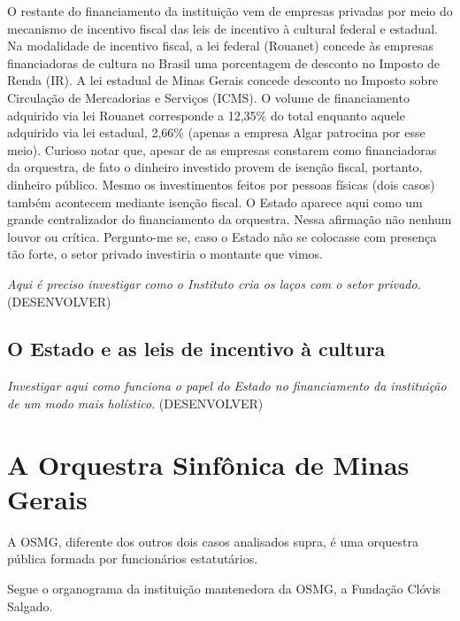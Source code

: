 \documentclass[a4paper, 12pt, openright, oneside, german, french, english, brazil]{abntex2}
\begin{document}
	O restante do financiamento da instituição vem de empresas privadas por meio do mecanismo de incentivo fiscal das leis de incentivo à cultural federal e estadual. Na modalidade de incentivo fiscal, a lei federal (Rouanet) concede às empresas financiadoras de cultura no Brasil uma porcentagem de desconto no Imposto de Renda (IR). A lei estadual de Minas Gerais concede desconto no Imposto sobre Circulação de Mercadorias e Serviços (ICMS). O volume de financiamento adquirido via lei Rouanet corresponde a 12,35\% do total enquanto aquele adquirido via lei estadual, 2,66\% (apenas a empresa Algar patrocina por esse meio). Curioso notar que, apesar de as empresas constarem como financiadoras da orquestra, de fato o dinheiro investido provem de isenção fiscal, portanto, dinheiro público. Mesmo os investimentos feitos por pessoas físicas (dois casos) também acontecem mediante isenção fiscal. O Estado aparece aqui como um grande centralizador do financiamento da orquestra. Nessa afirmação não nenhum louvor ou crítica. Pergunto-me se, caso o Estado não se colocasse com presença tão forte, o setor privado investiria o montante que vimos.
	
	\textit{Aqui é preciso investigar como o Instituto cria os laços com o setor privado.} (DESENVOLVER) 
	
	\subsection{O Estado e as leis de incentivo à cultura}
	
	\textit{Investigar aqui como funciona o papel do Estado no financiamento da instituição de um modo mais holístico}. (DESENVOLVER)
	
	\section{A Orquestra Sinfônica de Minas Gerais}
	
	A OSMG, diferente dos outros dois casos analisados supra, é uma orquestra pública formada por funcionários estatutários.
	
	Segue o organograma da instituição mantenedora da OSMG, a Fundação Clóvis Salgado.
	
\end{document}
